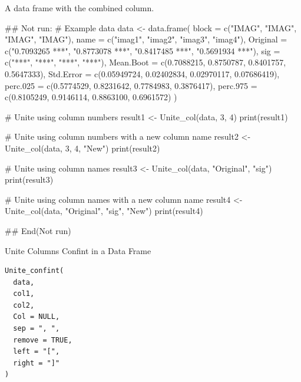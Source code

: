 \documentclass[a4paper]{book}
\begin{document}
%
\begin{Value}
A data frame with the combined column.
\end{Value}
%
\begin{Examples}
\begin{ExampleCode}
\#\# Not run: 
# Example data
data <- data.frame(
  block = c("IMAG", "IMAG", "IMAG", "IMAG"),
  name = c("imag1", "imag2", "imag3", "imag4"),
  Original = c("0.7093265 ***", "0.8773078 ***", "0.8417485 ***", "0.5691934 ***"),
  sig = c("***", "***", "***", "***"),
  Mean.Boot = c(0.7088215, 0.8750787, 0.8401757, 0.5647333),
  Std.Error = c(0.05949724, 0.02402834, 0.02970117, 0.07686419),
  perc.025 = c(0.5774529, 0.8231642, 0.7784983, 0.3876417),
  perc.975 = c(0.8105249, 0.9146114, 0.8863100, 0.6961572)
)

# Unite using column numbers
result1 <- Unite_col(data, 3, 4)
print(result1)

# Unite using column numbers with a new column name
result2 <- Unite_col(data, 3, 4, "New")
print(result2)

# Unite using column names
result3 <- Unite_col(data, "Original", "sig")
print(result3)

# Unite using column names with a new column name
result4 <- Unite_col(data, "Original", "sig", "New")
print(result4)

## End(Not run)
\end{ExampleCode}
\end{Examples}
%
\begin{Description}
Unite Columns Confint in a Data Frame
\end{Description}
%
\begin{Usage}
\begin{verbatim}
Unite_confint(
  data,
  col1,
  col2,
  Col = NULL,
  sep = ", ",
  remove = TRUE,
  left = "[",
  right = "]"
)
\end{verbatim}
\end{Usage}
%
\end{document}
